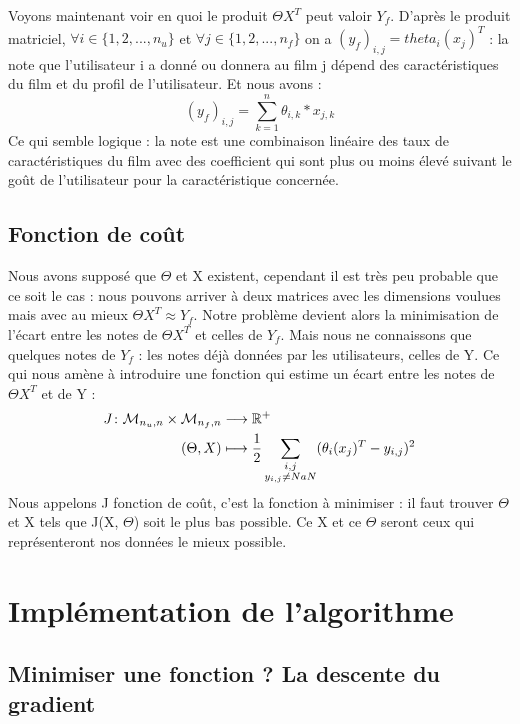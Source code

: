 \documentclass[a4paper,10pt]{article}
\begin{document}
Voyons maintenant voir en quoi le produit $\Theta X^T$ peut valoir $Y_f$. D'après le produit matriciel, $\forall i \in \{1, 2, ..., n_u\}$ et $\forall j \in \{1, 2, ..., n_f\}$ on a $(y_{f})_{i,j} = theta_{i}(x_{j})^{T}$ : la note que l'utilisateur i a donné ou donnera au film j dépend des caractéristiques du film et du profil de l'utilisateur. Et nous avons :
\[(y_{f})_{i,j} = \sum_{k = 1}^{n} \theta_{i,k} * x_{j,k}\]
Ce qui semble logique : la note est une combinaison linéaire des taux de caractéristiques du film avec des coefficient qui sont plus ou moins élevé suivant le goût de l'utilisateur pour la caractéristique concernée.

\subsection{Fonction de coût}

Nous avons supposé que $\Theta$ et X existent, cependant il est très peu probable que ce soit le cas : nous pouvons arriver à deux matrices avec les dimensions voulues mais avec au mieux $\Theta X^T \approx Y_f$. Notre problème devient alors la minimisation de l'écart entre les notes de $\Theta X^T$ et celles de $Y_f$. Mais nous ne connaissons que quelques notes de $Y_f$ : les notes déjà données par les utilisateurs, celles de Y. Ce qui nous amène à introduire une fonction qui estime un écart entre les notes de $\Theta X^T$ et de Y :
\begin{align*}
J\colon{\cal M}_{n_u, n} \times {\cal M}_{n_f, n} &\longrightarrow \mathbb{R}^+\\
(\Theta, X)&\longmapsto \frac{1}{2}\sum_{\substack{i,j \\ y_{i,j} \ne NaN}}(\theta_{i}(x_{j})^{T}-y_{i,j})^{2}
\end{align*}
Nous appelons J fonction de coût, c'est la fonction à minimiser : il faut trouver $\Theta$ et X tels que J(X, $\Theta$) soit le plus bas possible. Ce X et ce $\Theta$ seront ceux qui représenteront nos données le mieux possible.

\section{Implémentation de l'algorithme}
\subsection{Minimiser une fonction ? La descente du gradient}
\end{document}
